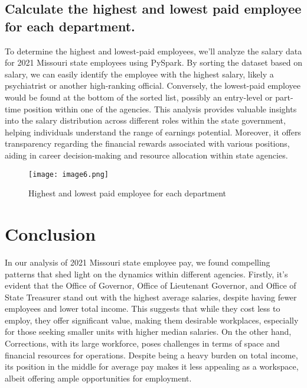 \documentclass{article}
\begin{document}
\subsection{Calculate the highest and lowest paid employee for each department.}

To determine the highest and lowest-paid employees, we'll analyze the salary data for 2021 Missouri state employees using PySpark. By sorting the dataset based on salary, we can easily identify the employee with the highest salary, likely a psychiatrist or another high-ranking official. Conversely, the lowest-paid employee would be found at the bottom of the sorted list, possibly an entry-level or part-time position within one of the agencies. This analysis provides valuable insights into the salary distribution across different roles within the state government, helping individuals understand the range of earnings potential. Moreover, it offers transparency regarding the financial rewards associated with various positions, aiding in career decision-making and resource allocation within state agencies.

\begin{figure}[h]
  \centering
  \texttt{[image: image6.png]} %
  \caption{Highest and lowest paid employee for each department}
  \label{fig:example}
\end{figure}


\section{Conclusion}


In our analysis of 2021 Missouri state employee pay, we found compelling patterns that shed light on the dynamics within different agencies. Firstly, it's evident that the Office of Governor, Office of Lieutenant Governor, and Office of State Treasurer stand out with the highest average salaries, despite having fewer employees and lower total income. This suggests that while they cost less to employ, they offer significant value, making them desirable workplaces, especially for those seeking smaller units with higher median salaries. On the other hand, Corrections, with its large workforce, poses challenges in terms of space and financial resources for operations. Despite being a heavy burden on total income, its position in the middle for average pay makes it less appealing as a workspace, albeit offering ample opportunities for employment.
\end{document}
